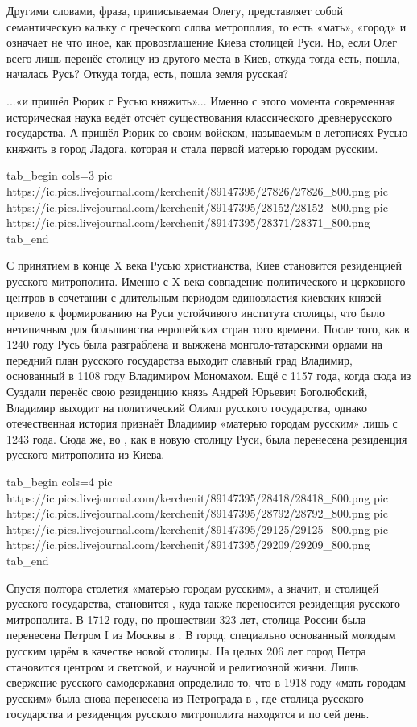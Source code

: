 Другими словами, фраза, приписываемая Олегу, представляет собой семантическую
кальку с греческого слова метрополия, то есть «мать», «город» и означает не что
иное, как провозглашение Киева столицей Руси. Но, если Олег всего лишь перенёс
столицу из другого места в Киев, откуда тогда есть, пошла, началась Русь?
Откуда тогда, есть, пошла земля русская?

...«и пришёл Рюрик с Русью княжить»... Именно с этого момента современная
историческая наука ведёт отсчёт существования классического древнерусского
государства. А пришёл Рюрик со своим войском, называемым в летописях Русью
княжить в город Ладога, которая и стала первой матерью городам русским.

\ifcmt
  tab_begin cols=3
     pic https://ic.pics.livejournal.com/kerchenit/89147395/27826/27826_800.png
     pic https://ic.pics.livejournal.com/kerchenit/89147395/28152/28152_800.png
     pic https://ic.pics.livejournal.com/kerchenit/89147395/28371/28371_800.png
  tab_end
\fi

С принятием в конце X века Русью христианства, Киев становится резиденцией
русского митрополита. Именно с X века совпадение политического и церковного
центров в сочетании с длительным периодом единовластия киевских князей привело
к формированию на Руси устойчивого института столицы, что было нетипичным для
большинства европейских стран того времени. После того, как в 1240 году Русь
была разграблена и выжжена монголо-татарскими ордами на передний план русского
государства выходит славный град Владимир, основанный в 1108 году Владимиром
Мономахом. Ещё с 1157 года, когда сюда из Суздали перенёс свою резиденцию князь
Андрей Юрьевич Боголюбский, Владимир выходит на политический Олимп русского
государства, однако отечественная история признаёт Владимир «матерью городам
русским» лишь с 1243 года. Сюда же, во , как в новую столицу Руси, была
перенесена резиденция русского митрополита из Киева.

\ifcmt
  tab_begin cols=4
     pic https://ic.pics.livejournal.com/kerchenit/89147395/28418/28418_800.png
     pic https://ic.pics.livejournal.com/kerchenit/89147395/28792/28792_800.png
     pic https://ic.pics.livejournal.com/kerchenit/89147395/29125/29125_800.png
     pic https://ic.pics.livejournal.com/kerchenit/89147395/29209/29209_800.png
  tab_end
\fi

Спустя полтора столетия «матерью городам русским», а значит, и столицей
русского государства, становится , куда также переносится
резиденция русского митрополита. В 1712 году, по прошествии 323 лет, столица
России была перенесена Петром I из Москвы в . В
город, специально основанный молодым русским царём в качестве новой столицы. На
целых 206 лет город Петра становится центром и светской, и научной и
религиозной жизни. Лишь свержение русского самодержавия определило то, что в
1918 году «мать городам русским» была снова перенесена из Петрограда в
, где столица русского государства и резиденция русского
митрополита находятся и по сей день.

